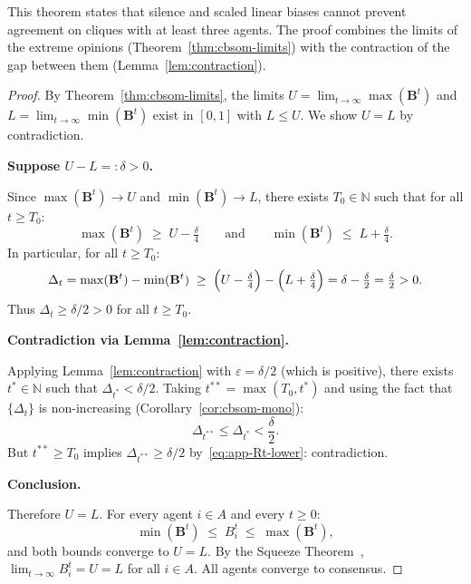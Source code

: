 \cbsomConsensus*

This theorem states that silence and scaled linear biases cannot prevent
agreement on cliques with at least three agents. The proof combines the
limits of the extreme opinions (Theorem~\ref{thm:cbsom-limits}) with the
contraction of the gap between them (Lemma~\ref{lem:contraction}).

\begin{proof}\label{proof:consensus-n3}
  By Theorem~\ref{thm:cbsom-limits}, the limits
  $U=\lim_{t\to\infty}\max(\mathbf{B}^t)$ and
  $L=\lim_{t\to\infty}\min(\mathbf{B}^t)$ exist in $[0,1]$ with $L\le U$.
  We show $U=L$ by contradiction.

  \medskip\noindent\textbf{Suppose $U-L=:\delta>0$.}

  Since $\max(\mathbf{B}^t)\to U$ and $\min(\mathbf{B}^t)\to L$,
  there exists $T_0\in\mathbb{N}$ such that for all $t\ge T_0$:
  \begin{equation}\label{eq:app-consensus-sandwich}
    \max(\mathbf{B}^t) \;\ge\; U-\tfrac{\delta}{4}
    \qquad\text{and}\qquad
    \min(\mathbf{B}^t) \;\le\; L+\tfrac{\delta}{4}.
  \end{equation}
  In particular, for all $t\ge T_0$:
  \begin{equation}\label{eq:app-Rt-lower}
    \Delta_t = \max(\mathbf{B}^t)-\min(\mathbf{B}^t)
    \;\ge\;
    \Bigl(U-\tfrac{\delta}{4}\Bigr)-\Bigl(L+\tfrac{\delta}{4}\Bigr)
    = \delta - \tfrac{\delta}{2} = \tfrac{\delta}{2} > 0.
  \end{equation}
  Thus $\Delta_t\ge\delta/2>0$ for all $t\ge T_0$.

  \medskip\noindent\textbf{Contradiction via Lemma~\ref{lem:contraction}.}

  Applying Lemma~\ref{lem:contraction} with $\varepsilon=\delta/2$
  (which is positive), there exists $t^*\in\mathbb{N}$ such that
  $\Delta_{t^*}<\delta/2$.
  Taking $t^{**}=\max(T_0,t^*)$ and using the fact that $\{\Delta_t\}$ is
  non-increasing (Corollary~\ref{cor:cbsom-mono}):
  \[\Delta_{t^{**}}\le \Delta_{t^*}<\frac{\delta}{2}.\]
  But $t^{**}\ge T_0$ implies $\Delta_{t^{**}}\ge\delta/2$
  by~\eqref{eq:app-Rt-lower}: contradiction.

  \medskip\noindent\textbf{Conclusion.}

  Therefore $U=L$.  For every agent $i\in A$ and every $t\ge 0$:
  \[\min(\mathbf{B}^t)\;\le\; B_i^t\;\le\;\max(\mathbf{B}^t),\]
  and both bounds converge to $U=L$.
  By the Squeeze Theorem~\cite{Houshang2014},
  $\lim_{t\to\infty}B_i^t=U=L$ for all $i\in A$.
  All agents converge to consensus.
\end{proof}
